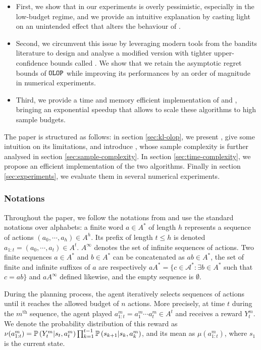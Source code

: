 \documentclass[runningheads, envcountsame, a4paper]{llncs}
\newcommand{\citep}{\cite}
\begin{document}
\begin{itemize}
    \item First, we show that in our experiments \OLOP is overly pessimistic, especially in the low-budget regime, and we provide an intuitive explanation by casting light on an unintended effect that alters the behaviour of \OLOP.
    \item Second, we circumvent this issue by leveraging modern tools from the bandits literature to design and analyse a modified version with tighter upper-confidence bounds called \KLOLOP. We show that we retain the asymptotic regret bounds of $\texttt{OLOP}$ while improving its performances by an order of magnitude in numerical experiments.
    \item Third, we provide a time and memory efficient implementation of \OLOP and \KLOLOP, bringing an exponential speedup that allows to scale these algorithms to high sample budgets.
\end{itemize}

The paper is structured as follows: in section \ref{sec:kl-olop}, we present \OLOP, give some intuition on its limitations, and introduce \KLOLOP, whose sample complexity is further analysed in section \ref{sec:sample-complexity}. In section \ref{sec:time-complexity}, we propose an efficient implementation of the two algorithms. Finally in section \ref{sec:experiments}, we evaluate them in several numerical experiments.

\subsubsection{Notations}
Throughout the paper, we follow the notations from \citep{Bubeck2010} and use the standard notations over alphabets: a finite word $a \in A^*$ of length $h$ represents a sequence of actions $(a_0, \cdots, a_h) \in A^h$. Its prefix of length $t \leq h$ is denoted $a_{1:t} = (a_0,\cdots,a_t) \in A^t$. $A^\infty$ denotes the set of infinite sequences of actions. Two finite sequences $a\in A^*$ and $b\in A^*$ can be concatenated as $ab\in A^*$, the set of finite and infinite suffixes of $a$ are respectively $a A^* = \{c\in\mathcal{A}^*: \exists b\in A^*$ such that $c=ab\}$ and $aA^\infty$ defined likewise, and the empty sequence is $\emptyset$.

During the planning process, the agent iteratively selects sequences of actions until it reaches the allowed budget of $n$ actions. More precisely, at time $t$ during the $m^{\text{th}}$ sequence, the agent played $a^m_{1:t} = a^m_1 \cdots a^m_t \in A^t$ and receives a reward $Y_t^m$. We denote the probability distribution of this reward as $\nu(a_{1:t}^m) = \mathbb{P}\left(Y_t^m | s_t, a^m_t\right) \prod_{k=1}^{t-1} \mathbb{P}\left(s_{k+1} | s_{k}, a_{k}^m\right)$, and its mean as $\mu(a_{1:t}^m)$, where $s_1$ is the current state.
\end{document}
